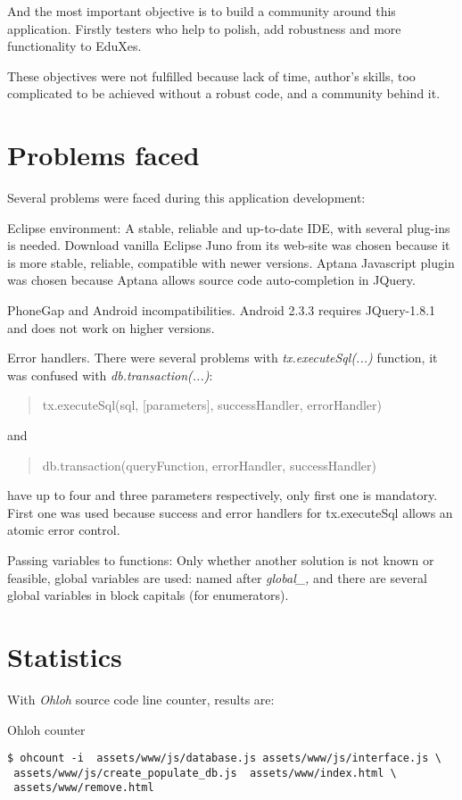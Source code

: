 And the most important objective is to build a community around this application. Firstly testers who help
to polish, add robustness  and  more functionality to EduXes.

These objectives were not fulfilled because lack of time, author's skills, too complicated to be achieved without a robust code,
and a community behind it.


\section {Problems faced}


Several problems were faced during this application development:

Eclipse environment: A stable, reliable and up-to-date IDE, with several plug-ins is needed. Download vanilla Eclipse Juno from its web-site was chosen because it is more stable, reliable, compatible with newer versions.  Aptana Javascript plugin was chosen because Aptana allows source code auto-completion in JQuery.

PhoneGap and Android incompatibilities. Android 2.3.3 requires JQuery-1.8.1 and does not work on higher versions. 


Error handlers. There were several problems with \textit{tx.executeSql(...)} function, it was confused with \textit{db.transaction(...)}: 
\begin{quote}
tx.executeSql(sql, [parameters],  successHandler, errorHandler)    
\end{quote}
and
\begin{quote}
db.transaction(queryFunction, errorHandler, successHandler)  
\end{quote}
have up to four and three parameters respectively, only first one is mandatory. First one was used because  success and error handlers for tx.executeSql allows an atomic error control.


Passing variables to functions: Only whether another solution is not known or feasible, global variables are used: named after \textit{global\_\*,} and there are several global variables in block capitals (for enumerators).

\section{Statistics}

With \textit{Ohloh} source code line counter, results are:
 \begin{bclogo}[couleur=green!30,arrondi=0.1, logo=\bcpanchant,  ombre=true ] 
{Ohloh counter}   
\begin{verbatim}
$ ohcount -i  assets/www/js/database.js assets/www/js/interface.js \
 assets/www/js/create_populate_db.js  assets/www/index.html \
 assets/www/remove.html 
\end{verbatim}
\end{bclogo}

